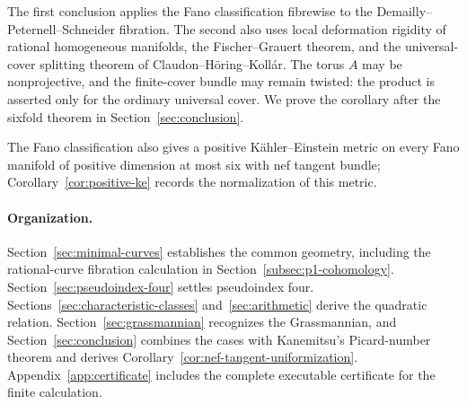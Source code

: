 The first conclusion applies the Fano classification fibrewise to the
Demailly--Peternell--Schneider fibration. The second also uses local
deformation rigidity of rational homogeneous manifolds, the
Fischer--Grauert theorem, and the universal-cover splitting theorem of
Claudon--H\"oring--Koll\'ar. The torus $A$ may be nonprojective, and the
finite-cover bundle may remain twisted: the product is asserted only
for the ordinary universal cover. We prove the corollary after the
sixfold theorem in Section~\ref{sec:conclusion}.

The Fano classification also gives a positive K\"ahler--Einstein metric
on every Fano manifold of positive dimension at most six with nef tangent bundle;
Corollary~\ref{cor:positive-ke} records the normalization of this metric.

\paragraph{Organization.}
Section~\ref{sec:minimal-curves} establishes the common geometry,
including the rational-curve fibration calculation in
Section~\ref{subsec:p1-cohomology}.
Section~\ref{sec:pseudoindex-four} settles pseudoindex four.
Sections~\ref{sec:characteristic-classes} and~\ref{sec:arithmetic}
derive the quadratic relation. Section~\ref{sec:grassmannian}
recognizes the Grassmannian, and Section~\ref{sec:conclusion}
combines the cases with Kanemitsu's Picard-number theorem and derives
Corollary~\ref{cor:nef-tangent-uniformization}.
Appendix~\ref{app:certificate} includes the complete executable
certificate for the finite calculation.
